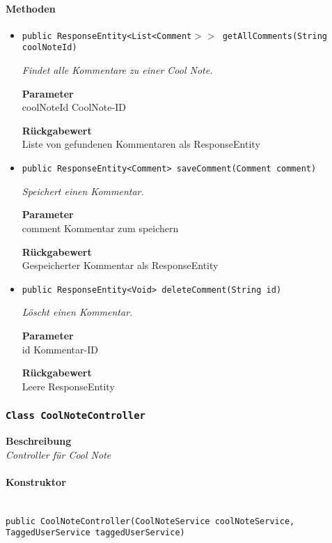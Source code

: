     \paragraph*{Methoden}
    \begin{itemize}
    	\item{\texttt{public ResponseEntity<List<Comment$>>$ getAllComments(String coolNoteId)}}
    	
    	\textit{Findet alle Kommentare zu einer Cool Note.}
    	
    	\textbf{Parameter} \\
    	coolNoteId CoolNote-ID
    	
    	\textbf{Rückgabewert} \\
    	Liste von gefundenen Kommentaren als ResponseEntity        \item{\texttt{public ResponseEntity<Comment> saveComment(Comment comment)}}
    	
    	\textit{Speichert einen Kommentar.}
    	
    	\textbf{Parameter} \\
    	comment Kommentar zum speichern
    	
    	\textbf{Rückgabewert} \\
    	Gespeicherter Kommentar als ResponseEntity        \item{\texttt{public ResponseEntity<Void> deleteComment(String id)}}
    	
    	\textit{Löscht einen Kommentar.}
    	
    	\textbf{Parameter} \\
    	id Kommentar-ID
    	
    	\textbf{Rückgabewert} \\
    	Leere ResponseEntity
    \end{itemize}
    \subsubsection{\texttt{Class CoolNoteController}}
    \textbf{Beschreibung} \\
    \textit{Controller für Cool Note}
    \paragraph*{Konstruktor}\mbox{} \\
    \texttt{public CoolNoteController(CoolNoteService coolNoteService, TaggedUserService taggedUserService)} \\
